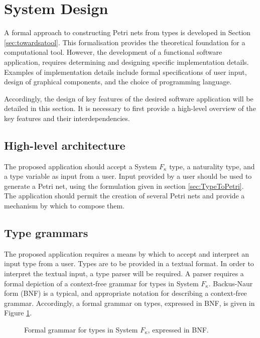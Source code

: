 \documentclass[../Dissertation.tex]{subfiles}
\begin{document}
\section{System Design}
A formal approach to constructing Petri nets from types is developed in Section \ref{sec:towardsatool}. This formalisation provides the theoretical foundation for a computational tool. However, the development of a functional software application, requires determining and designing specific implementation details. Examples of implementation details include formal specifications of user input, design of graphical components, and the choice of programming language. 
\par
Accordingly, the design of key features of the desired software application will  be detailed in this section. It is necessary to first provide a high-level overview of the key features and their interdependencies.

\subsection{High-level architecture}
The proposed application should accept a System $F_\kappa$ type, a naturality type, and a type variable as input from a user. Input provided by a user should be used to generate a Petri net, using the formulation given in section \ref{sec:TypeToPetri}. The application should permit the creation of several Petri nets and provide a mechanism by which to compose them. 

\subsection{Type grammars}
The proposed application requires a means by which to accept and interpret an input type from a user. Types are to be provided in a textual format. In order to interpret the textual input, a type parser will be required. A parser requires a formal depiction of a context-free grammar for types in System $F_\kappa$. Backus-Naur form (BNF) is a typical, and appropriate notation for describing a context-free grammar. Accordingly, a formal grammar on types, expressed in BNF, is given in Figure \ref{fig:typegrammar}.

\begin{figure}[H]

\caption{Formal grammar for types in System $F_\kappa$, expressed in BNF.}
\label{fig:typegrammar}
\end{figure}
\end{document}
